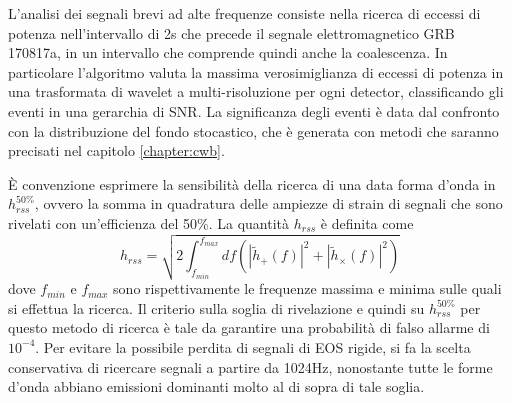 L'analisi dei segnali brevi ad alte frequenze consiste nella ricerca di eccessi di potenza nell'intervallo di 2s che precede il segnale elettromagnetico GRB 170817a, in un intervallo che comprende quindi anche la coalescenza.
In particolare l'algoritmo valuta la massima verosimiglianza di eccessi di potenza in una trasformata di wavelet a multi-risoluzione per ogni detector, classificando gli eventi in una gerarchia di SNR. La significanza degli eventi è data dal confronto con la distribuzione del fondo stocastico, che è generata con metodi che saranno precisati nel capitolo \ref{chapter:cwb}. 

È convenzione esprimere la sensibilità della ricerca di una data forma d'onda in $h_{rss}^{50\%}$, ovvero la somma in quadratura delle ampiezze di strain di segnali che sono rivelati con un'efficienza del 50\%. La quantità $h_{rss}$ è definita come
\begin{equation}
	h_{rss} = \sqrt{2\int_{f_{min}}^{f_{max}}df(|\tilde{h}_+(f)|^2 + |\tilde{h}_\times(f)|^2 )}
\end{equation}
dove $f_{min}$ e $f_{max}$ sono rispettivamente le frequenze massima e minima sulle quali si effettua la ricerca. 
Il criterio sulla soglia di rivelazione e quindi su $h_{rss}^{50\%}$ per questo metodo di ricerca è tale da garantire una probabilità di falso allarme di $10^{-4}$.
Per evitare la possibile perdita di segnali di EOS rigide, si fa la scelta conservativa di ricercare segnali a partire da 1024Hz, nonostante tutte le forme d'onda abbiano emissioni dominanti molto al di sopra di tale soglia.

